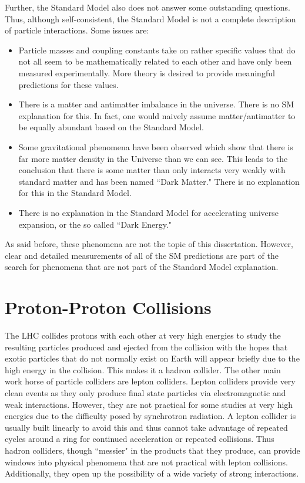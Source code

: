  Further, the Standard Model also does not answer some outstanding questions. Thus, although self-consistent, the Standard Model is not a complete description of particle interactions. Some issues are:
 \begin{itemize}
 \item Particle masses and coupling constants take on rather specific values that do not all seem to be mathematically related to each other and have only been measured experimentally. More theory is desired to provide meaningful predictions for these values.
 \item There is a matter and antimatter imbalance in the universe. There is no SM explanation for this. In fact, one would naively assume matter/antimatter to be equally abundant based on the Standard Model.
 \item Some gravitational phenomena have been observed which show that there is far more matter density in the Universe than we can see. This leads to the conclusion that there is some matter than only interacts very weakly with standard matter and has been named ``Dark Matter." There is no explanation for this in the Standard Model.
 \item There is no explanation in the Standard Model for accelerating universe expansion, or the so called ``Dark Energy." 
  \end{itemize}

As said before, these phenomena are not the topic of this dissertation. However, clear and detailed measurements of all of the SM predictions are part of the search for phenomena that are not part of the Standard Model explanation.

	\section{Proton-Proton Collisions} 
	\label{sec:pp_collisions}         
The LHC collides protons with each other at very high energies to study the resulting particles produced and ejected from the collision with the hopes that exotic particles that do not normally exist on Earth will appear briefly due to the high energy in the collision. This makes it a hadron collider. The other main work horse of particle colliders are lepton colliders. Lepton colliders provide very clean events as they only produce final state particles via electromagnetic and weak interactions. However, they are not practical for some studies at very high energies due to the difficulty posed by synchrotron radiation. A lepton collider is usually built linearly to avoid this and thus cannot take advantage of repeated cycles around a ring for continued acceleration or repeated collisions. Thus hadron colliders, though ``messier" in the products that they produce, can provide windows into physical phenomena that are not practical with lepton collisions. Additionally, they open up the possibility of a wide variety of strong interactions.\\


